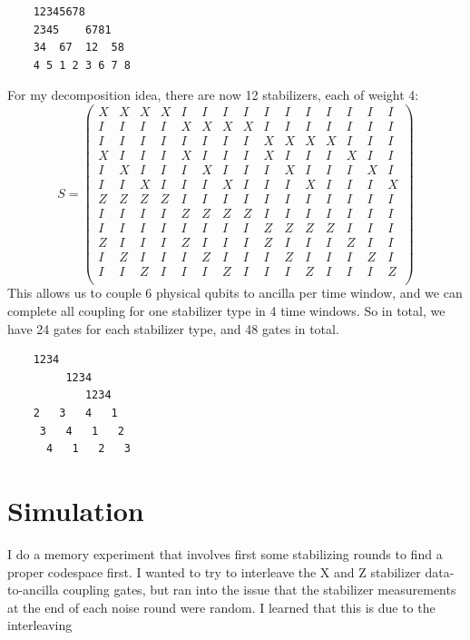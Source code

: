 \documentclass{article}
\begin{document}
\begin{verbatim}
    12345678
    2345    6781
    34  67  12  58
    4 5 1 2 3 6 7 8
\end{verbatim}
For my decomposition idea, there are now 12 stabilizers, each of weight 4:
\[S = \begin{pmatrix}
    X & X & X & X & I & I & I & I & I & I & I & I & I & I & I \\
    I & I & I & I & X & X & X & X & I & I & I & I & I & I & I \\
    I & I & I & I & I & I & I & I & X & X & X & X & I & I & I \\
    X & I & I & I & X & I & I & I & X & I & I & I & X & I & I \\
    I & X & I & I & I & X & I & I & I & X & I & I & I & X & I \\
    I & I & X & I & I & I & X & I & I & I & X & I & I & I & X \\
    Z & Z & Z & Z & I & I & I & I & I & I & I & I & I & I & I \\
    I & I & I & I & Z & Z & Z & Z & I & I & I & I & I & I & I \\
    I & I & I & I & I & I & I & I & Z & Z & Z & Z & I & I & I \\
    Z & I & I & I & Z & I & I & I & Z & I & I & I & Z & I & I \\
    I & Z & I & I & I & Z & I & I & I & Z & I & I & I & Z & I \\
    I & I & Z & I & I & I & Z & I & I & I & Z & I & I & I & Z \\
\end{pmatrix}\]
This allows us to couple 6 physical qubits to ancilla per time window, and we can complete all coupling for one stabilizer type in 4 time windows. So in total, we have 24 gates for each stabilizer type, and 48 gates in total.
\begin{verbatim}
    1234
         1234
            1234
    2   3   4   1
     3   4   1   2
      4   1   2   3
\end{verbatim}

\section{Simulation}
I do a memory experiment that involves first some stabilizing rounds to find a proper codespace first. I wanted to try to interleave the X and Z stabilizer data-to-ancilla coupling gates, but ran into the issue that the stabilizer measurements at the end of each noise round were random. I learned that this is due to the interleaving
\end{document}
